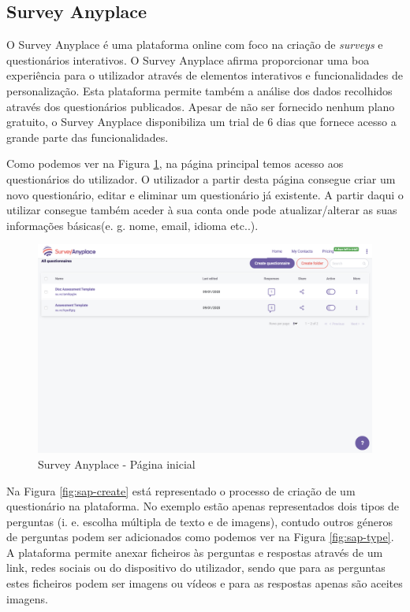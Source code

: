 \subsection{Survey Anyplace}
\label{surveyanyplaceM}



O Survey Anyplace é uma plataforma online com foco na criação de \textit{surveys} e questionários interativos. O Survey Anyplace afirma proporcionar uma boa experiência para o utilizador através de elementos interativos e funcionalidades de personalização. Esta plataforma permite também a análise dos dados recolhidos através dos questionários publicados. Apesar de não ser fornecido nenhum plano gratuito, o Survey Anyplace disponibiliza um trial de 6 dias que fornece acesso a grande parte das funcionalidades.

Como podemos ver na Figura \ref{fig:sap-dash}, na página principal temos acesso aos questionários do utilizador. O utilizador a partir desta página consegue criar um novo questionário, editar e eliminar um questionário já existente. A partir daqui o utilizar consegue também aceder à sua conta onde pode atualizar/alterar as suas informações básicas(e. g. nome, email, idioma etc..). 


\begin{figure}[ht!]
	\begin{center}
		\includegraphics[width=1\textwidth]{img/sap/dash}
		\caption{Survey Anyplace - Página inicial}
		\label{fig:sap-dash}
	\end{center}
\end{figure}

Na Figura \ref{fig:sap-create} está representado o processo de criação de um questionário na plataforma. No exemplo estão apenas representados dois tipos de perguntas (i. e. escolha múltipla de texto e de imagens), contudo outros géneros de perguntas podem ser adicionados como podemos ver na Figura \ref{fig:sap-type}. A plataforma permite anexar ficheiros às perguntas e respostas através de um link, redes sociais ou do dispositivo do utilizador, sendo que para as perguntas estes ficheiros podem ser imagens ou vídeos e para as respostas apenas são aceites imagens.

